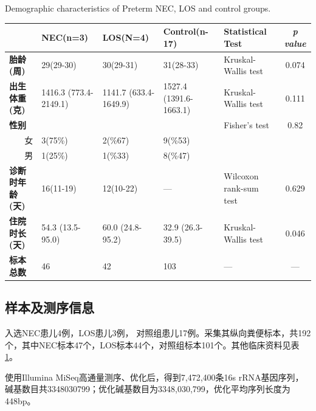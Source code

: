   \begin{table}[!hpb]
    \centering
      {Demographic characteristics of Preterm NEC, LOS and control groups.}
    \label{tab:necdemographic}
    \begin{tabular}{lp{1.8cm}p{1.8cm}p{1.8cm}p{2cm}c}
      \toprule
         & \textbf{NEC(n=3)} & \textbf{LOS(N=4)} & \textbf{Control(n-17)} & \textbf{Statistical Test} & \textit{p value} \\ \midrule
        \textbf{胎龄(周)} & 29(29-30) & 30(29-31) & 31(28-33) & Kruskal-Wallis test & 0.074 \\
        \textbf{出生体重(克)} & 1416.3 (773.4-2149.1) & 1141.7 (633.4-1649.9) & 1527.4 (1391.6-1663.1) & Kruskal-Wallis test & 0.111 \\
        \textbf{性别} &  &  &  & Fisher's test & 0.82 \\
        \multicolumn{1}{r}{女} & 3(75\%) & 2(\%67) & 9(\%53) &  & \\
        \multicolumn{1}{r}{男} & 1(25\%) & 1(\%33) & 8(\%47) &  & \\
        \textbf{诊断时年龄(天)} & 16(11-19) & 12(10-22) & — & Wilcoxon rank-sum test & 0.629 \\
        \textbf{住院时长(天)} & 54.3 (13.5-95.0) & 60.0 (24.8-95.2) & 32.9 (26.3-39.5) & Kruskal-Wallis test & 0.046 \\
        \textbf{标本总数} & 46 & 42 & 103 & — & — \\ \bottomrule
    \end{tabular}
  \end{table}

  \subsection{样本及测序信息}
  入选NEC患儿4例，LOS患儿3例， 对照组患儿17例。采集其纵向粪便标本，共192个，其中NEC标本47个，LOS标本44个，对照组标本101个。其他临床资料见表\ref{tab:necdemographic}。

  使用Illumina MiSeq高通量测序、优化后，得到7,472,400条16s rRNA基因序列，碱基数目共3348030799；优化碱基数目为3348,030,799，优化平均序列长度为448bp。
